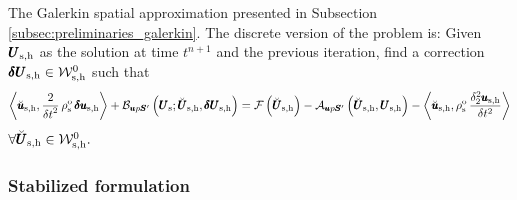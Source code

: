 \documentclass[11pt,english]{article}
\def\devPK{\pmb{S}^\prime}                      %
\def\unknosolid{\pmb{U}_{\rm{s}}}               %
\def\usolidh{\pmb{u}_{\rm{s},\rm{h}}}                    %
\def\unknosolidh{\pmb{U}_{\rm{s},\rm{h}}}                %
\def\testusolidh{\breve{\pmb{u}}_{\rm{s},\rm{h}}}       %
\def\testsolidh{\breve{\pmb{U}}_{\rm{s},\rm{h}}}        %
\def\usolidinch{\pmb{\delta u}_{\rm{s},\rm{h}}}           %
\def\unknosolidinch{\pmb{\delta U}_{\rm{s},\rm{h}}}       %
\def\testsolidspaceh{\mathcal{W}_{\rm{s},\rm{h}}^{0}}     %
\def\denssolid{\rho_{\rm{s}}^{\rm{o}}}  %
\def\ups{\pmb{u} p \devPK}
\def\dt{{\delta t}}                                     %
\def\BDFduhdt2{\frac{\delta_2^2 \usolidh}{\delta t^2}}    %
\begin{document}
The Galerkin spatial approximation presented in Subsection \ref{subsec:preliminaries_galerkin}. The discrete version of the problem is: Given $\unknosolidh$ as the solution at time $t^{n+1}$ and  the previous iteration, find a correction $\unknosolidinch \in \testsolidspaceh$ such that
\begin{equation*}
    \left \langle \testusolidh , \frac{2}{\dt^2}\, \denssolid \, \usolidinch \right \rangle + \mathcal{B}_{\ups} \left ( \unknosolid ; \testsolidh, \unknosolidinch \right) = \mathcal{F} \left ( \testsolidh  \right) -  \mathcal{A}_{\ups} \left ( \testsolidh , \unknosolidh \right) - \left \langle \testusolidh, \denssolid \, \BDFduhdt2 \right \rangle
\end{equation*}
$\forall \testsolidh \in \testsolidspaceh.$
\subsubsection{Stabilized formulation\label{subsubsec:ups_stabilization}}
\end{document}
